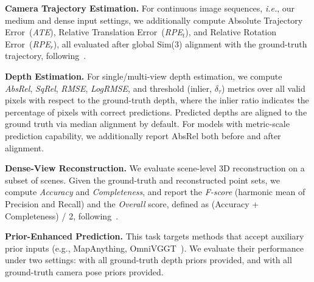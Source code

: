 \textbf{Camera Trajectory Estimation.} 
For continuous image sequences, \emph{i.e.}, our medium and dense input settings, we additionally compute Absolute Trajectory Error~(\textit{ATE}), Relative Translation Error~(\textit{RPE}$_t$), and Relative Rotation Error~(\textit{RPE}$_r$), all evaluated after global Sim(3) alignment with the ground-truth trajectory, following~\citet{teed2021droid-slam}.

\textbf{Depth Estimation.} 
For single/multi-view depth estimation, we compute \textit{AbsRel}, \textit{SqRel}, \textit{RMSE}, \textit{LogRMSE}, and threshold (inlier, $\delta_{\tau}$) metrics over all valid pixels with respect to the ground-truth depth, where the inlier ratio indicates the percentage of pixels with correct predictions.
%
Predicted depths are aligned to the ground truth via median alignment by default.
%
For models with metric-scale prediction capability, we additionally report AbsRel 
both before and after alignment.

\textbf{Dense-View Reconstruction.} 
We evaluate scene-level 3D reconstruction on a subset of scenes. 
%
Given the ground-truth and reconstructed point sets, we compute \textit{Accuracy} and \textit{Completeness}, and report the \textit{F-score} (harmonic mean of Precision and Recall) and the \textit{Overall} score, defined as (Accuracy + Completeness) / 2, following~\citet{lin2025depth}.

\textbf{Prior-Enhanced Prediction.} 
This task targets methods that accept auxiliary prior inputs (e.g., MapAnything, OmniVGGT~\citep{keetha2026mapanything,peng2025omnivggt}).  
%
We evaluate their performance under two settings: with all ground-truth depth priors provided, and with all ground-truth camera pose priors provided.
